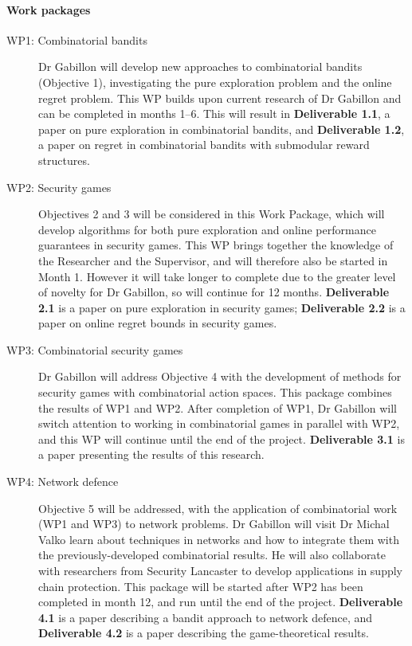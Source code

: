\documentclass[a4paper,11pt]{article}
\begin{document}
\paragraph{Work packages}
\begin{description}
\item[WP1: Combinatorial bandits] Dr Gabillon will develop new approaches to combinatorial bandits (Objective 1), investigating the pure exploration problem and the online regret problem.  This WP builds upon current research of Dr Gabillon and can be completed in months 1--6.  This will result in {\bf Deliverable 1.1}, a paper on pure exploration in combinatorial bandits, and {\bf Deliverable 1.2}, a paper on regret in combinatorial bandits with submodular reward structures.
\item[WP2: Security games] Objectives 2 and 3 will be considered in this Work Package, which will develop algorithms for both pure exploration and online performance guarantees in security games.  This WP brings together the knowledge of the Researcher and the Supervisor, and will therefore also be started in Month 1.  However it will take longer to complete due to the greater level of novelty for Dr Gabillon, so will continue for 12 months.  {\bf Deliverable 2.1} is a paper on pure exploration in security games; {\bf Deliverable 2.2} is a paper on online regret bounds in security games.
\item[WP3: Combinatorial security games] Dr Gabillon will address Objective 4 with the development  of methods for security games with combinatorial action spaces. This package combines the results of WP1 and WP2.  After completion of WP1, Dr Gabillon will switch attention to working in combinatorial games in parallel with WP2, and this WP will continue until the end of the project.  {\bf Deliverable 3.1} is a paper presenting the results of this research.
\item[WP4: Network defence] Objective 5 will be addressed, with the application of combinatorial work (WP1 and WP3) to network problems. Dr Gabillon will visit Dr Michal Valko learn about techniques in networks and how to integrate them with the previously-developed combinatorial results.  He will also collaborate with researchers from Security Lancaster to develop applications in supply chain protection.  This package will be started after WP2 has been completed in month 12, and run until the end of the project. {\bf Deliverable 4.1} is a paper describing a bandit approach to network defence, and {\bf Deliverable 4.2} is a paper describing the game-theoretical results.
\end{description}
\end{document}
